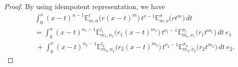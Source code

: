 \documentclass[a4paper,12pt]{article}
\theoremstyle{remark}
\begin{document}
\begin{proof}	
	By using idempotent representation, we have
	\begin{equation}\label{eq:idempotent}
\begin{split}
&	\int_0^x (x - t)^{n - 1} \mathbb{E}_{m,n}^{l}\big(r(x - t)^{m}\big) \, t^{\nu - 1} \mathbb{E}_{m,\nu}^{\sigma}\big(r t^{m}\big) \, dt \\&=	\int_0^x (x - t)^{n_1 - 1} \mathbb{E}_{m_1,n_1}^{l_1}\big(r_1(x - t)^{m_1}\big) \, t^{\nu_1 - 1} \mathbb{E}_{m_1,\nu_1}^{\sigma_1}\big(r_1 t^{m_1}\big) \, dt~ e_1\\
&~+	\int_0^x (x - t)^{n_2 - 1} \mathbb{E}_{m_2,n_2}^{l_2}\big(r_2(x - t)^{m_2}\big) \, t^{\nu_2 - 1} \mathbb{E}_{m_2,\nu_2}^{\sigma_2}\big(r_2 t^{m_2}\big) \, dt ~e_2.
\end{split}
	\end{equation}
     

\end{proof}
\end{document}
